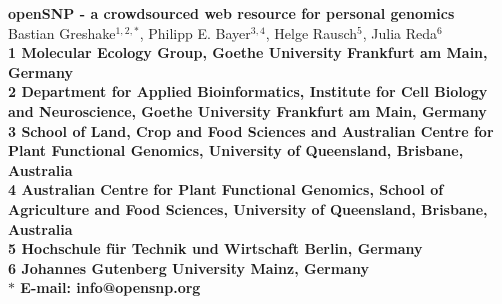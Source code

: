 \documentclass[10pt]{article}
\date{}
\begin{document}
\begin{flushleft}
{\Large
\textbf{openSNP - a crowdsourced web resource for personal genomics}
}
% 
\\
Bastian Greshake$^{1,2,\ast}$, 
Philipp E. Bayer$^{3,4}$, 
Helge Rausch$^{5}$,
Julia Reda$^{6}$
\\
\bf{1} Molecular Ecology Group, Goethe University Frankfurt am Main, Germany
\\
\bf{2} Department for Applied Bioinformatics, Institute for Cell Biology and Neuroscience, Goethe University Frankfurt am Main, Germany 
\\
\bf{3} School of Land, Crop and Food Sciences and Australian Centre for Plant Functional Genomics, University of Queensland, Brisbane, Australia
\\
\bf{4} Australian Centre for Plant Functional Genomics, School of Agriculture and Food Sciences, University of Queensland, Brisbane, Australia
\\
\bf{5} Hochschule f\"ur Technik und Wirtschaft Berlin, Germany 
\\
\bf{6} Johannes Gutenberg University Mainz, Germany
\\
$\ast$ E-mail: info@opensnp.org
\end{flushleft}

\end{document}
